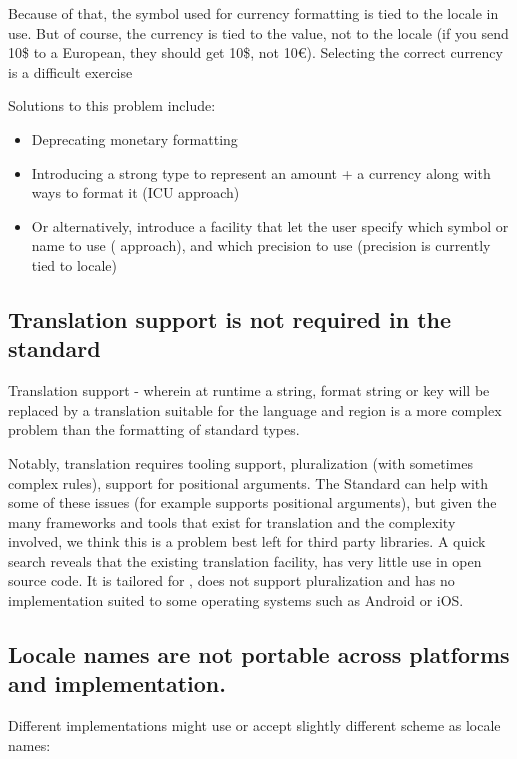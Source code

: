 \documentclass{wg21}
\begin{document}
Because of that, the symbol used for currency formatting is tied to the locale in use.
But of course, the currency is tied to the value, not to the locale (if you send 10\$ to a European, they should get 10\$, not 10€).
Selecting the correct currency is a difficult exercise \cite{Stackoverflow}

Solutions to this problem include:

\begin{itemize}
    \item Deprecating monetary formatting
    \item Introducing a strong type to represent an amount + a currency along with ways to format it (ICU approach)
    \item Or alternatively, introduce a facility that let the user specify which symbol or name to use (\cite{QLocale} approach), and which precision to use (precision is currently tied to locale)
\end{itemize}

\subsection{Translation support is not required in the standard}

Translation support - wherein at runtime a string, format string or key will be replaced by a translation suitable for the language and region is a more complex problem than the formatting of standard types.

Notably, translation requires tooling support, pluralization (with sometimes complex rules), support for positional arguments.
The Standard can help with some of these issues (for example  supports positional arguments), but given the many frameworks and tools that exist for translation and the complexity involved, we think this is a problem best left for third party libraries.
A quick search reveals that the existing translation facility,  has very little use in open source code.
It is tailored for , does not support pluralization and has no implementation suited to some operating systems such as Android or iOS.


\subsection{Locale names are not portable across platforms and implementation.}

Different implementations might use or accept slightly different scheme as locale names:
\end{document}
